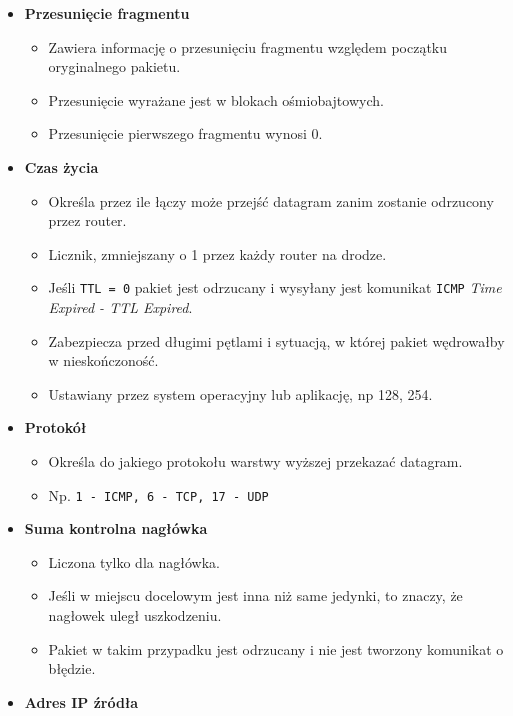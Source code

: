 \documentclass[../sk-egzamin.tex]{subfiles}
\begin{document}
\begin{itemize}
    \item \textbf{Przesunięcie fragmentu} 
    \begin{itemize}
        \item Zawiera informację o przesunięciu fragmentu względem początku oryginalnego pakietu.
        \item Przesunięcie wyrażane jest w blokach ośmiobajtowych.
        \item Przesunięcie pierwszego fragmentu wynosi 0.
    \end{itemize}
    \item \textbf{Czas życia}  
    \begin{itemize}
        \item Określa przez ile łączy może przejść datagram zanim zostanie
        odrzucony przez router.
        \item Licznik, zmniejszany o 1 przez każdy router na drodze.
        \item Jeśli \texttt{TTL = 0} pakiet jest odrzucany i wysyłany jest
        komunikat \texttt{ICMP} \textit{Time Expired - TTL Expired}.
        \item Zabezpiecza przed długimi pętlami i sytuacją, w której pakiet
        wędrowałby w nieskończoność.
        \item Ustawiany przez system operacyjny lub aplikację, np 128, 254.
    \end{itemize}
    \item \textbf{Protokół} 
    \begin{itemize}
        \item Określa do jakiego protokołu warstwy wyższej przekazać datagram.
        \item Np. \texttt{1 - ICMP, 6 - TCP, 17 - UDP}
    \end{itemize}
    \item \textbf{Suma kontrolna nagłówka} 
    \begin{itemize}
        \item Liczona tylko dla nagłówka.
        \item Jeśli w miejscu docelowym jest inna niż same jedynki, to znaczy,
        że nagłowek uległ uszkodzeniu.
        \item Pakiet w takim przypadku jest odrzucany i nie jest tworzony
        komunikat o błędzie.
    \end{itemize}
    \item \textbf{Adres IP źródła} 

\end{itemize}
\end{document}
